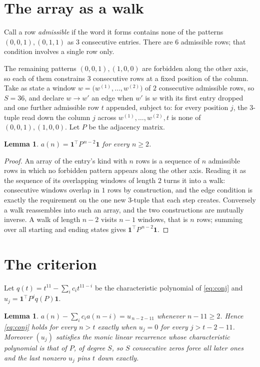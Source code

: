 \documentclass[11pt,a4paper]{article}
\theoremstyle{plain}
\newtheorem{lemma}[theorem]{Lemma}
\theoremstyle{definition}
\begin{document}
\section{The array as a walk}

Call a row \emph{admissible} if the word it forms contains none of the patterns
$(0,0,1), (0,1,1)$ as $3$ consecutive entries. There are $6$ admissible rows; that condition
involves a single row only.

The remaining patterns $(0,0,1), (1,0,0)$ are forbidden along the other axis, so each of them
constrains $3$ consecutive rows at a fixed position of the column. Take as state a
window $w=\bigl(w^{(1)},\dots,w^{(2)}\bigr)$ of $2$ consecutive admissible
rows, so $S=36$, and declare $w\to w'$ an edge when $w'$ is $w$ with its first entry
dropped and one further admissible row $t$ appended, subject to: for every position
$j$, the $3$-tuple read down the column $j$ across $w^{(1)},\dots,w^{(2)},t$
is none of $(0,0,1), (1,0,0)$. Let $P$ be the adjacency matrix.

\begin{lemma}\label{lem:walk}
$a(n)=\mathbf{1}^{\!\top}P^{\,n-2}\mathbf{1}$ for every $n\ge2$.
\end{lemma}

\begin{proof}
An array of the entry's kind with $n$ rows is a sequence of $n$ admissible rows in
which no forbidden pattern appears along the other axis. Reading it as the sequence of its
overlapping windows of length $2$ turns it into a walk: consecutive windows overlap in
$1$ rows by construction, and the edge condition is exactly the requirement on the one
new $3$-tuple that each step creates. Conversely a walk reassembles into such an array,
and the two constructions are mutually inverse. A walk of length $n-2$ visits $n-1$
windows, that is $n$ rows; summing over all starting and ending states gives
$\mathbf{1}^{\!\top}P^{\,n-2}\mathbf{1}$.
\end{proof}

\section{The criterion}

Let $q(t)=t^{11}-\sum_i c_i t^{11-i}$ be the characteristic polynomial of
\eqref{eq:conj} and $u_j=\mathbf{1}^{\!\top}P^{j}q(P)\mathbf{1}$.

\begin{lemma}\label{lem:crit}
$a(n)-\sum_i c_i a(n-i)=u_{\,n-2-11}$ whenever $n-11\ge2$. Hence
\eqref{eq:conj} holds for every $n>t$ exactly when $u_j=0$ for every
$j>t-2-11$. Moreover $(u_j)$ satisfies the monic linear recurrence whose
characteristic polynomial is that of $P$, of degree $S$, so $S$ consecutive zeros force all
later ones and the last nonzero $u_j$ pins $t$ down exactly.
\end{lemma}
\end{document}
